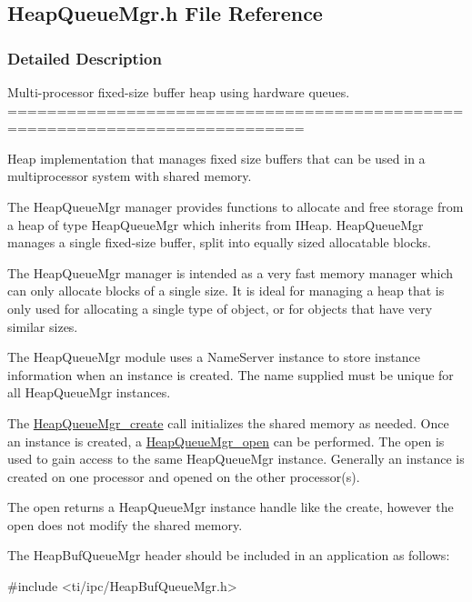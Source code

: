 \subsection{HeapQueueMgr.h File Reference}
\label{_heap_queue_mgr_8h}


\subsubsection{Detailed Description}
Multi-\/processor fixed-\/size buffer heap using hardware queues. ============================================================================

Heap implementation that manages fixed size buffers that can be used in a multiprocessor system with shared memory.

The HeapQueueMgr manager provides functions to allocate and free storage from a heap of type HeapQueueMgr which inherits from IHeap. HeapQueueMgr manages a single fixed-\/size buffer, split into equally sized allocatable blocks.

The HeapQueueMgr manager is intended as a very fast memory manager which can only allocate blocks of a single size. It is ideal for managing a heap that is only used for allocating a single type of object, or for objects that have very similar sizes.

The HeapQueueMgr module uses a NameServer instance to store instance information when an instance is created. The name supplied must be unique for all HeapQueueMgr instances.

The \hyperlink{_heap_queue_mgr_8h_a8acac32c7ae380cdc55b4951f2df0858}{HeapQueueMgr\_\-create} call initializes the shared memory as needed. Once an instance is created, a \hyperlink{_heap_queue_mgr_8h_acb03450cb0411fe7f122e293150ad601}{HeapQueueMgr\_\-open} can be performed. The open is used to gain access to the same HeapQueueMgr instance. Generally an instance is created on one processor and opened on the other processor(s).

The open returns a HeapQueueMgr instance handle like the create, however the open does not modify the shared memory.

The HeapBufQueueMgr header should be included in an application as follows: 
\begin{DoxyCode}
  #include <ti/ipc/HeapBufQueueMgr.h>
\end{DoxyCode}


